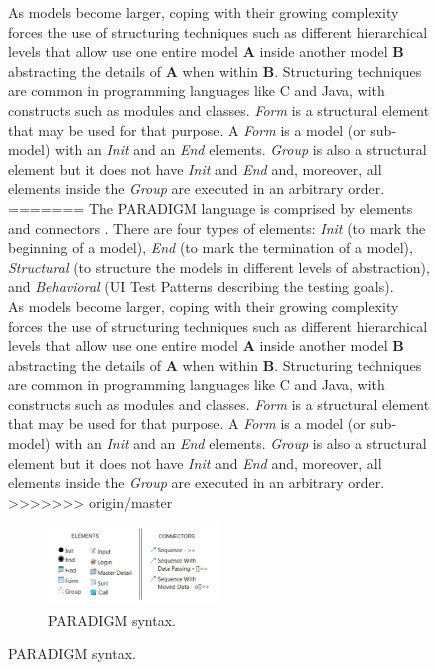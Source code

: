 \documentclass[conference]{IEEEtran}
\begin{document}
\begin{enumerate}
\begin{figure}[!htb]
As models become larger, coping with their growing complexity forces the use of structuring techniques such as different hierarchical levels that allow use one entire model \textbf{A} inside another model \textbf{B} abstracting the details of \textbf{A} when within \textbf{B}. Structuring techniques are common in programming languages like C and Java, with constructs such as modules and classes. \textit{Form} is a structural element that may be used for that purpose. A \textit{Form} is a model (or sub-model) with an \textit{Init} and an \textit{End} elements. \textit{Group} is also a structural element but it does not have \textit{Init} and \textit{End} and, moreover, all elements inside the \textit{Group} are executed in an arbitrary order.
=======
The PARADIGM language is comprised by elements and connectors \cite{moreira2013pattern}. There are four types of elements: \textit{Init} (to mark the beginning of a model), \textit{End} (to mark the termination of a model), \textit{Structural} (to structure the models in different levels of abstraction), and \textit{Behavioral} (UI Test Patterns describing the testing goals).\\

As models become larger, coping with their growing complexity forces the use of structuring techniques such as different hierarchical levels that allow use one entire model \textbf{A} inside another model \textbf{B} abstracting the details of \textbf{A} when within \textbf{B}. Structuring techniques are common in programming languages like C and Java, with constructs such as modules and classes. \textit{Form} is a structural element that may be used for that purpose. A \textit{Form} is a model (or sub-model) with an \textit{Init} and an \textit{End} elements. \textit{Group} is also a structural element but it does not have \textit{Init} and \textit{End} and, moreover, all elements inside the \textit{Group} are executed in an arbitrary order.\\
>>>>>>> origin/master

\begin{figure}[!htb]
\centering
\includegraphics[width=0.5\textwidth]{dsl1}
\caption{PARADIGM syntax.}
\label{fig:dsl1}
\end{figure}


\end{figure}
\end{enumerate}
\end{document}
